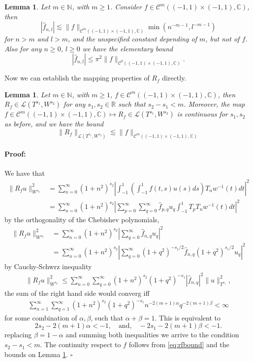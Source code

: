 \documentclass{article}
\newtheorem{lemma}[theorem]{Lemma}
\newenvironment{proof}{\paragraph{Proof:}}{\hfill$\square$}
\newcommand{\IC}{{\mathbb C}}
\newcommand{\IN}{{\mathbb N}}
\newcommand{\IR}{{\mathbb R}}
\newcommand{\cmspace}[3]{\mathcal{C}^{#1} \left( #2, #3 \right)}
\newcommand{\iinterv}{(-1,1)\times(-1,1)}
\begin{document}
\begin{lemma}
\label{lemma:cmdecay}
Let $m \in \IN$, with $m\geq 1$. Consider $f \in \cmspace{m}{\iinterv}{\IC}$, then 
$$|\widehat{f}_{n,l}| \lesssim \|f\|_{\cmspace{m}{\iinterv}{\IC}}  \min ( n^{-m-1}, l^{-m-1})$$
for $n>m$ and $l>m$, and the unspecified constant depending of $m$, but not of $f$. Also for any $n \geq 0$, $l \geq 0$ we have the elementary bound 
$$ |\widehat{f}_{n,l}| \leq \pi^2 \|f\|_{\cmspace{0}{\iinterv}{\IC}}  .$$
\end{lemma}
Now we can establish the mapping properties of $R_f$ directly. 
\begin{lemma}
\label{lemma:Rfoperator}
Let $m \in \IN$, with $m\geq 1$, $f \in \cmspace{m}{\iinterv}{\IC}$, then $R_f \in \mathcal{L}(T^{s_1}, W^{s_2})$ for any $s_1,s_2 \in \IR$ such that $s_2 -s_1 < m$.  Moreover, the map $f \in \cmspace{m}{\iinterv}{\IC} \mapsto R_f \in \mathcal{L}(T^{s_1}, W^{s_2})$ is continuous for $s_1, s_2$ as before, and we have the bound 
$$
\| R_f \|_{\mathcal{L}(T^{s_1}, W^{s_2})} \lesssim \| f\|_{\cmspace{m}{\iinterv}{\IC}}
$$
\end{lemma}
\begin{proof}
We have that 
\begin{align*}
\|R_fu\|_{W^{s_2}}^2  &= \sum_{n=0}^\infty (1+n^2)^{s_2} \left\vert 
\int_{-1}^1 \left( \int_{-1}^1 f(t,s) u(s) ds\right) T_n w^{-1}(t) dt\right\vert^2\\
& = 
\sum_{n=0}^\infty (1+n^2)^{s_2} \left\vert  \sum_{p=0}^\infty \sum_{q=0}^\infty \widehat{f}_{p,q} u_q
\int_{-1}^1 T_p   T_n w^{-1}(t) dt \right\vert^2
\end{align*} 
by the orthogonality of the Chebishev polynomials,
 \begin{align*}
\|R_fu\|_{W^{s_2}}^2  &=
\sum_{n=0}^\infty (1+n^2)^{s_2} \left\vert   \sum_{q=0}^\infty \widehat{f}_{n,q} u_q
 \right\vert^2 
 \\
 &= 
\sum_{n=0}^\infty (1+n^2)^{s_2} \left\vert   \sum_{q=0}^\infty (1+q^2)^{-s_1/2}\widehat{f}_{n,q} (1 +q^2)^{s_1/2}u_q
 \right\vert^2  
\end{align*} 
by Cauchy-Schwrz inequality 
\begin{align}
\label{eq:rfbound}
\|R_fu\|_{W^{s_2}}^2  \leq 
\sum_{n=0}^\infty \sum_{q=0}^\infty (1+n^2)^{s_2}     (1+q^2)^{-s_1}|\widehat{f}_{n,q}|^2  \| u\|^2_{T^{s_1}},
\end{align}
the sum of the right hand side would converg iff
\begin{align*}
\sum_{n=1}^\infty \sum_{q=1}^\infty (1+n^2)^{s_2}     (1+q^2)^{-s_1} n^{-2(m+1)\alpha} q^{-2(m+1)\beta} < \infty
\end{align*}
for some combination of $\alpha,\beta$, such that $\alpha + \beta = 1$. This is equivalent to 
$$2s_2 -2(m+1)\alpha < -1, \quad \text{and,} \quad -2s_1 -2(m+1)\beta < -1. $$
replacing $\beta = 1 - \alpha$ and summing both inequalities we arrive to the condition $s_2-s_1 < m$.  The continuity respect to $f$ follows from   \eqref{eq:rfbound} and the bounds on Lemma \ref{lemma:cmdecay}.
\end{proof}
\end{document}
